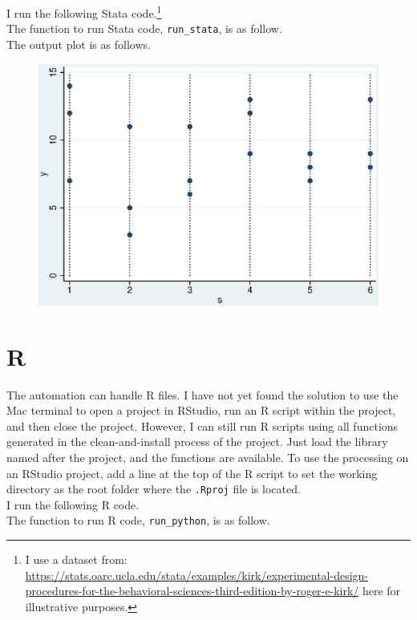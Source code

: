\documentclass[12pt, a4paper]{article}
\begin{document}
I run the following Stata code.\footnote{I use a dataset from: \url{https://stats.oarc.ucla.edu/stata/examples/kirk/experimental-design-procedures-for-the-behavioral-sciences-third-edition-by-roger-e-kirk/} here for illustrative purposes.}\\



The function to run Stata code, \texttt{run\_stata}, is as follow.\\



The output plot is as follows.\\

\begin{figure}[H]
	\includegraphics[width=.5\textwidth]{sample_stata_graph}
\end{figure}

\section{R}

The automation can handle R files. I have not yet found the solution to use the Mac terminal to open a project in RStudio, run an R script within the project, and then close the project. However, I can still run R scripts using all functions generated in the clean-and-install process of the project. Just load the library named after the project, and the functions are available. To use the processing on an RStudio project, add a line at the top of the R script to set the working directory as the root folder where the \texttt{.Rproj} file is located.\\

I run the following R code.\\



The function to run R code, \texttt{run\_python}, is as follow.\\
\end{document}
